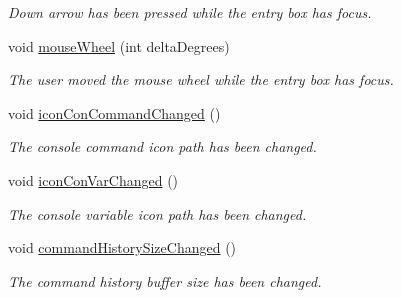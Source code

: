 \begin{DoxyCompactItemize}
\begin{DoxyCompactList}\small\item\em Down arrow has been pressed while the entry box has focus. \end{DoxyCompactList}\item 
void \hyperlink{class_command_entry_box_a8399e5aa78c5841dd0c60f7a5285410b}{mouse\-Wheel} (int delta\-Degrees)
\begin{DoxyCompactList}\small\item\em The user moved the mouse wheel while the entry box has focus. \end{DoxyCompactList}\item 
\hypertarget{class_command_entry_box_ac13c5c8a5aa22fd0fb264010ee271ea8}{void \hyperlink{class_command_entry_box_ac13c5c8a5aa22fd0fb264010ee271ea8}{icon\-Con\-Command\-Changed} ()}\label{class_command_entry_box_ac13c5c8a5aa22fd0fb264010ee271ea8}

\begin{DoxyCompactList}\small\item\em The console command icon path has been changed. \end{DoxyCompactList}\item 
\hypertarget{class_command_entry_box_a971a6587e79b6420a09963c09daa61a4}{void \hyperlink{class_command_entry_box_a971a6587e79b6420a09963c09daa61a4}{icon\-Con\-Var\-Changed} ()}\label{class_command_entry_box_a971a6587e79b6420a09963c09daa61a4}

\begin{DoxyCompactList}\small\item\em The console variable icon path has been changed. \end{DoxyCompactList}\item 
\hypertarget{class_command_entry_box_a89f2868238ec30998795c227fbaab143}{void \hyperlink{class_command_entry_box_a89f2868238ec30998795c227fbaab143}{command\-History\-Size\-Changed} ()}\label{class_command_entry_box_a89f2868238ec30998795c227fbaab143}

\begin{DoxyCompactList}\small\item\em The command history buffer size has been changed. \end{DoxyCompactList}\end{DoxyCompactItemize}
